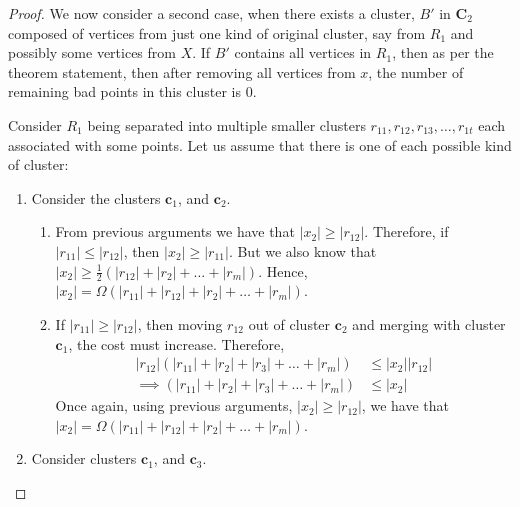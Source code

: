 \begin{proof}
We now consider a second case, when there exists a cluster, $B'$ in $\mathbf{C}_2$ composed of vertices from just one kind of original cluster, say from $R_1$ and possibly some vertices from $X$. If $B'$ contains all vertices in $R_1$, then as per the theorem statement, then after removing all vertices from $x$, the number of remaining bad points in this cluster is $0$.

Consider $R_1$ being separated into multiple smaller clusters $r_{11}, r_{12}, r_{13}, \dots, r_{1t}$ each associated with some points. Let us assume that there is one of each possible kind of cluster:
\begin{enumerate}
    \item Consider the clusters $\mathbf{c}_1$, and $\mathbf{c}_2$.
    \begin{enumerate}
        \item From previous arguments we have that $|x_2| \ge |r_{12}|$. Therefore, if $|r_{11}| \leq |r_{12}|$, then $|x_2| \ge |r_{11}|$. But we also know that $|x_2| \ge \frac12 (|r_{12}| + |r_2| + \dots + |r_m|)$. Hence, $|x_2| = \Omega (|r_{11}|+|r_{12}|+|r_2|+\dots+|r_m|)$.
        \item If $|r_{11}| \ge |r_{12}|$, then moving $r_{12}$ out of cluster $\mathbf{c}_2$ and merging with cluster $\mathbf{c}_1$, the cost must increase. Therefore,
        \begin{align*}
            |r_{12}| \left(|r_{11}| + |r_2| + |r_3| + \dots + |r_m| \right) &\le |x_2| |r_{12}|\\
            \implies (|r_{11}| + |r_2| + |r_3| + \dots + |r_m|) &\le |x_2|
        \end{align*}
        Once again, using previous arguments, $|x_2| \ge |r_{12}|$, we have that $|x_2| = \Omega (|r_{11}| + |r_{12}| + |r_2| + \dots + |r_m|)$.
    \end{enumerate}
    \item Consider clusters $\mathbf{c}_1$, and $\mathbf{c}_3$.

\end{enumerate}
\end{proof}
